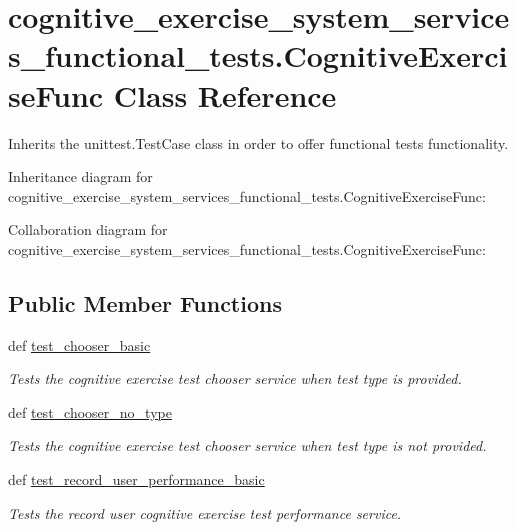 \hypertarget{classcognitive__exercise__system__services__functional__tests_1_1CognitiveExerciseFunc}{\section{cognitive\-\_\-exercise\-\_\-system\-\_\-services\-\_\-functional\-\_\-tests.\-Cognitive\-Exercise\-Func Class Reference}
\label{classcognitive__exercise__system__services__functional__tests_1_1CognitiveExerciseFunc}
}


Inherits the unittest.\-Test\-Case class in order to offer functional tests functionality.  




Inheritance diagram for cognitive\-\_\-exercise\-\_\-system\-\_\-services\-\_\-functional\-\_\-tests.\-Cognitive\-Exercise\-Func\-:


Collaboration diagram for cognitive\-\_\-exercise\-\_\-system\-\_\-services\-\_\-functional\-\_\-tests.\-Cognitive\-Exercise\-Func\-:
\subsection*{Public Member Functions}
\begin{DoxyCompactItemize}
\item 
def \hyperlink{classcognitive__exercise__system__services__functional__tests_1_1CognitiveExerciseFunc_a287a720d8fbe9a1a2f375cae695353ab}{test\-\_\-chooser\-\_\-basic}
\begin{DoxyCompactList}\small\item\em Tests the cognitive exercise test chooser service when test type is provided. \end{DoxyCompactList}\item 
def \hyperlink{classcognitive__exercise__system__services__functional__tests_1_1CognitiveExerciseFunc_a40cbd2c6dee3d8c707e470663c09c86f}{test\-\_\-chooser\-\_\-no\-\_\-type}
\begin{DoxyCompactList}\small\item\em Tests the cognitive exercise test chooser service when test type is not provided. \end{DoxyCompactList}\item 
def \hyperlink{classcognitive__exercise__system__services__functional__tests_1_1CognitiveExerciseFunc_a3acf48c7deadcfd227fd3378b03e81d5}{test\-\_\-record\-\_\-user\-\_\-performance\-\_\-basic}
\begin{DoxyCompactList}\small\item\em Tests the record user cognitive exercise test performance service. \end{DoxyCompactList}\end{DoxyCompactItemize}


